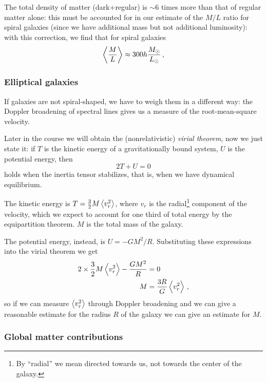 \documentclass[main.tex]{subfiles}
\begin{document}
The total density of matter (dark+regular) is \(\sim 6\) times more than that of regular matter alone: this must be accounted for in our estimate of the \(M/L\) ratio for spiral galaxies (since we have additional mass but not additional luminosity):
with this correction, we find that for spiral galaxies
%
\begin{align}
\expval{\frac{M}{L}} \approx 300 h \frac{M_{\odot}}{L_{\odot}}
\,,
\end{align}
%

\subsubsection{Elliptical galaxies}

If galaxies are not spiral-shaped, we have to weigh them in a different way: the Doppler broadening of spectral lines gives us a measure of the root-mean-square velocity.

Later in the course we will obtain the (nonrelativistic) \emph{virial theorem}, now we just state it: if \(T\) is the kinetic energy of a gravitationally bound system, \(U\) is the potential energy, then
%
\begin{equation}
  2T + U = 0
\end{equation}
%
holds when the inertia tensor stabilizes, that is, when we have dynamical equilibrium.

The kinetic energy is \(T = \frac{3}{2} M \expval{v_r^2} \), where \(v_r\) is the radial\footnote{By ``radial'' we mean directed towards us, not towards the center of the galaxy.}
component of the velocity, which we expect to account for one third of total energy by the equipartition theorem.
\(M\) is the total mass of the galaxy.

The potential energy, instead, is \(U = - G M^2 /R\). Substituting these expressions into the virial theorem we get
%
\begin{align}
2 \times \frac{3}{2} M \expval{v_r^2} - \frac{GM^2}{R} &= 0  \\
M &= \frac{3R}{G} \expval{v_r^2}
\,,
\end{align}
%
so if we can measure \(\expval{v_r^2}\) through Doppler broadening and we can give a reasonable estimate for the radius \(R\) of the galaxy we can give an estimate for \(M\).

\subsubsection{Global matter contributions}
\end{document}
